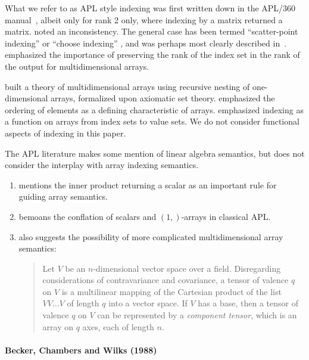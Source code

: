 What we refer to as APL style indexing was first written down in the APL/360
manual~\cite{Falkoff1968}, albeit only for rank 2 only, where indexing by a
matrix returned a matrix. \cite{Haegi1976} noted an inconsistency. The general
case has been termed ``scatter-point indexing'' or ``choose indexing''
\cite{Brown1972,Ruehr1982}, and was perhaps most clearly described
in~\cite{More1979}. \cite{Gull1979} emphasized the importance of preserving
the rank of the index set in the rank of the output for multidimensional
arrays.

\cite{More1973} built a theory of multidimensional arrays using recursive
nesting of one-dimensional arrays, formalized upon axiomatic set theory.
\cite{Ghandour1973} emphasized the ordering of elements as a defining
characteristic of arrays. \cite{Gerth1988} emphasized indexing as a function on
arrays from index sets to value sets. We do not consider functional aspects of
indexing in this paper.

The APL literature makes some mention of linear algebra semantics, but does not
consider the interplay with array indexing semantics.

\begin{enumerate}
\item \cite{More1973} mentions the inner product returning a scalar as an
	important rule for guiding array semantics.

\item \cite{Haegi1976} bemoans the conflation of scalars and $(1,)$-arrays in
	classical APL.

\item \cite[p. 153]{More1973} also suggests the possibility of more complicated
	multidimensional array semantics:

\begin{quote}
Let $V$ be an $n$-dimensional vector space over a field. Disregarding
considerations of contravariance and covariance, a tensor of valence $q$ on $V$
is a multilinear mapping of the Cartesian product of the list $V V \dots V$ of
length $q$ into a vector space. If $V$ has a base, then a tensor of valence $q$
on $V$ can be represented by a \textit{component tensor}, which is an array on
$q$ axes, each of length $n$.
\end{quote}

\end{enumerate}


\paragraph{Becker, Chambers and Wilks (1988)~\cite{Becker1988}}

